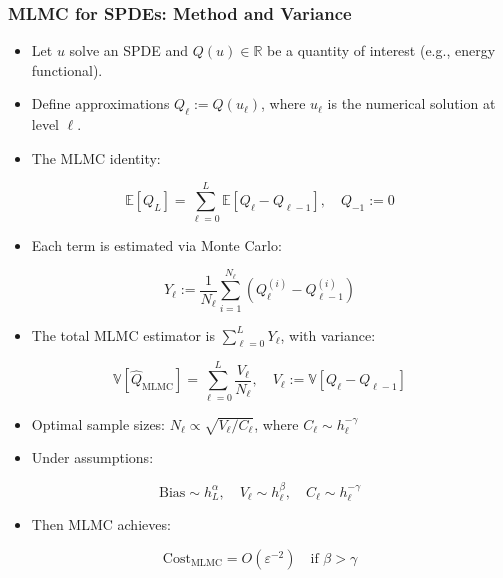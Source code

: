 \documentclass[aspectratio=169]{beamer}
\begin{document}
\begin{frame}
  \frametitle{MLMC for SPDEs: Method and Variance}

  \begin{itemize}
    \item Let \( u \) solve an SPDE and \( Q(u) \in \mathbb{R} \) be a quantity of interest (e.g., energy functional).
    \item Define approximations \( Q_\ell := Q(u_\ell) \), where \( u_\ell \) is the numerical solution at level \( \ell \).
    \item The MLMC identity:
  \end{itemize}

  \[
    \mathbb{E}[Q_L] = \sum_{\ell=0}^L \mathbb{E}[Q_\ell - Q_{\ell-1}], \quad Q_{-1} := 0
  \]

  \begin{itemize}
    \item Each term is estimated via Monte Carlo:
  \end{itemize}

  \[
    Y_\ell := \frac{1}{N_\ell} \sum_{i=1}^{N_\ell} \left( Q_\ell^{(i)} - Q_{\ell-1}^{(i)} \right)
  \]

  \begin{itemize}
    \item The total MLMC estimator is \( \sum_{\ell=0}^L Y_\ell \), with variance:
  \end{itemize}

  \[
    \mathbb{V}[\hat{Q}_{\text{MLMC}}] = \sum_{\ell=0}^L \frac{V_\ell}{N_\ell}, \quad V_\ell := \mathbb{V}[Q_\ell - Q_{\ell-1}]
  \]

  \begin{itemize}
    \item Optimal sample sizes: \( N_\ell \propto \sqrt{V_\ell / C_\ell} \), where \( C_\ell \sim h_\ell^{-\gamma} \)
    \item Under assumptions:
  \end{itemize}

  \[
    \text{Bias} \sim h_L^\alpha, \quad V_\ell \sim h_\ell^\beta, \quad C_\ell \sim h_\ell^{-\gamma}
  \]

  \begin{itemize}
    \item Then MLMC achieves:
  \end{itemize}

  \[
    \boxed{\text{Cost}_{\text{MLMC}} = O(\varepsilon^{-2}) \quad \text{if } \beta > \gamma}
  \]

\end{frame}
\end{document}
